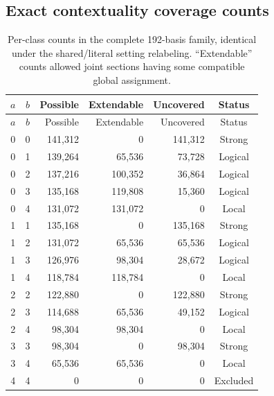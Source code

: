 \documentclass[11pt,a4paper]{article}
\theoremstyle{definition}\newtheorem{definition}[theorem]{Definition}
\begin{document}
\subsection{Exact contextuality coverage counts}
\begin{longtable}{@{}ccrrrc@{}}
\caption{Per-class counts in the complete 192-basis family, identical under the shared/literal setting relabeling. ``Extendable'' counts allowed joint sections having some compatible global assignment.}\label{tab:contexts}\\
\toprule $a$ & $b$ & Possible & Extendable & Uncovered & Status\\\midrule\endfirsthead
\toprule $a$ & $b$ & Possible & Extendable & Uncovered & Status\\\midrule\endhead
0 & 0 & 141,312 & 0 & 141,312 & Strong\\
0 & 1 & 139,264 & 65,536 & 73,728 & Logical\\
0 & 2 & 137,216 & 100,352 & 36,864 & Logical\\
0 & 3 & 135,168 & 119,808 & 15,360 & Logical\\
0 & 4 & 131,072 & 131,072 & 0 & Local\\
1 & 1 & 135,168 & 0 & 135,168 & Strong\\
1 & 2 & 131,072 & 65,536 & 65,536 & Logical\\
1 & 3 & 126,976 & 98,304 & 28,672 & Logical\\
1 & 4 & 118,784 & 118,784 & 0 & Local\\
2 & 2 & 122,880 & 0 & 122,880 & Strong\\
2 & 3 & 114,688 & 65,536 & 49,152 & Logical\\
2 & 4 & 98,304 & 98,304 & 0 & Local\\
3 & 3 & 98,304 & 0 & 98,304 & Strong\\
3 & 4 & 65,536 & 65,536 & 0 & Local\\
4 & 4 & 0 & 0 & 0 & Excluded\\
\bottomrule\end{longtable}
\end{document}
